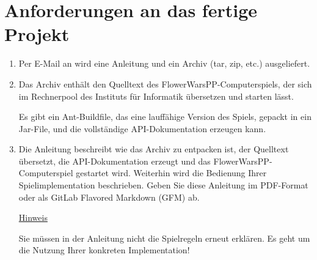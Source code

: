 \section*{Anforderungen an das fertige Projekt}
\begin{enumerate}
\item Per E-Mail an  wird eine Anleitung und ein Archiv (tar, zip, etc.) ausgeliefert.
\item Das Archiv enthält den Quelltext des FlowerWarsPP-Computerspiels, der sich im Rechnerpool des Instituts für Informatik übersetzen und starten lässt.

Es gibt ein Ant-Buildfile, das eine lauffähige Version des Spiels, gepackt in ein Jar-File, und die vollständige API-Dokumentation erzeugen kann.
\item Die Anleitung beschreibt wie das Archiv zu entpacken ist, der Quelltext übersetzt, die API-Dokumentation erzeugt und das FlowerWarsPP-Computerspiel gestartet wird. Weiterhin wird die Bedienung Ihrer Spielimplementation beschrieben. Geben Sie diese Anleitung im PDF-Format oder als GitLab Flavored Markdown (GFM) ab.

\underline{Hinweis}

Sie müssen in der Anleitung nicht die Spielregeln erneut erklären. Es geht um die Nutzung Ihrer konkreten Implementation!
\end{enumerate}
